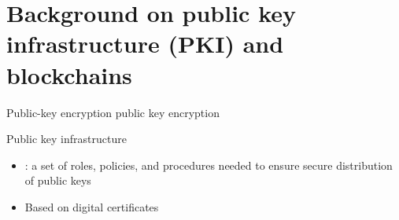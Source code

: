 \section[PKI and blockchains]{Background on public key infrastructure (PKI) and blockchains}

\begin{frame}{Public-key encryption}
public key encryption
\end{frame}

\begin{frame}{Public key infrastructure}

\begin{itemize}
\item {}: a set of roles, policies, and procedures needed to
ensure
secure distribution of public keys
\item Based on digital certificates
\end{itemize}



%

\end{frame}



